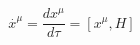 \begin{equation}
\stackrel{.}{x}^{\mu }=\frac{dx^{\mu }}{d\tau }=\left[ x^{\mu },H\right]
\label{hamilton}
\end{equation}

